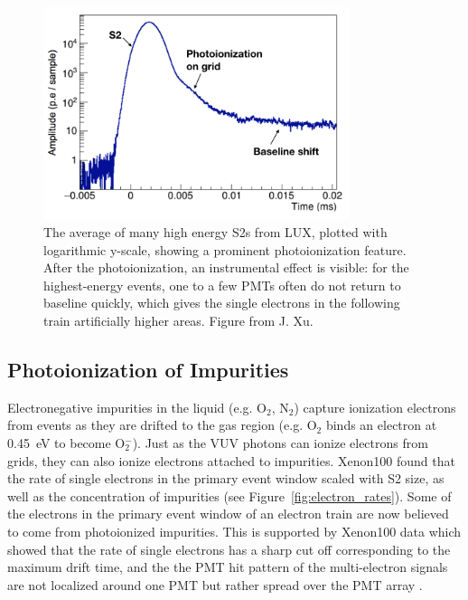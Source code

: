 \begin{figure}[htbp]
\begin{center}
\includegraphics[width=0.8\textwidth]{figures/etrains/s2_averages.png}
\caption{The average of many high energy S2s from \ac{LUX}, plotted with logarithmic y-scale, showing a prominent photoionization feature. After the photoionization, an instrumental effect is visible: for the highest-energy events, one to a few \ac{PMT}s often do not return to baseline quickly, which gives the single electrons in the following train artificially higher areas. Figure from J. Xu. }
\label{fig:s2_averages}
\end{center}
\end{figure}


\subsection{Photoionization of Impurities} 
\label{sec:photoionization_impurities}
Electronegative impurities in the liquid (e.g. O$_{2}$, N$_{2}$) capture ionization electrons from events as they are drifted to the gas region (e.g. O$_{2}$ binds an electron at 0.45~eV to become O$^{-}_{2}$). Just as the \ac{VUV} photons can ionize electrons from grids, they can also ionize electrons attached to impurities. Xenon100 found that the rate of single electrons in the primary event window scaled with S2 size, as well as the concentration of impurities \cite{Aprile2014} (see Figure~\ref{fig:electron_rates}). Some of the electrons in the primary event window of an electron train are now believed to come from photoionized impurities. This is supported by Xenon100 data which showed that the rate of single electrons has a sharp cut off corresponding to the maximum drift time, and the the PMT hit pattern of the multi-electron signals are not localized around one PMT but rather spread over the PMT array \cite{Aprile2014}. 

